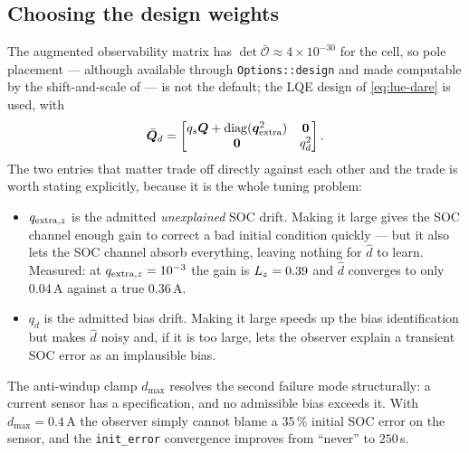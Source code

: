 \subsection{Choosing the design weights}
The augmented observability matrix has $\det\bar{\mathcal{O}}\approx4\times10^{-30}$ for the cell,
so pole placement --- although available through \texttt{Options::design} and made computable by
the shift-and-scale of  --- is not the default; the LQE design of
\eqref{eq:lue-dare} is used, with
\begin{equation}
\bar{\bm{Q}}_d = \begin{bmatrix} q_s\bm{Q} + \operatorname{diag}(\bm{q}_{\mathrm{extra}}^2) & \bm{0}\\
\bm{0} & q_d^2\end{bmatrix} .
\label{eq:dob-Q}
\end{equation}
The two entries that matter trade off directly against each other and the trade is worth stating
explicitly, because it is the whole tuning problem:
\begin{itemize}[nosep]
\item $q_{\mathrm{extra},z}$ is the admitted \emph{unexplained} SOC drift.  Making it large
gives the SOC channel enough gain to correct a bad initial condition quickly --- but it also lets
the SOC channel absorb everything, leaving nothing for $\hat{d}$ to learn.  Measured: at
$q_{\mathrm{extra},z}=10^{-3}$ the gain is $L_{z}=0.39$ and $\hat{d}$ converges to only
$0.04$\,A against a true $0.36$\,A.
\item $q_d$ is the admitted bias drift.  Making it large speeds up the bias identification but
makes $\hat{d}$ noisy and, if it is too large, lets the observer explain a transient SOC error as
an implausible bias.
\end{itemize}
The anti-windup clamp $d_{\max}$ resolves the second failure mode structurally: a current sensor
has a specification, and no admissible bias exceeds it.  With $d_{\max}=0.4$\,A the observer
simply cannot blame a $35\,\%$ initial SOC error on the sensor, and the \texttt{init\_error}
convergence improves from ``never'' to $250$\,s.

